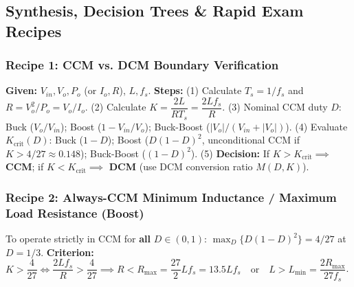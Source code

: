 \subsection{Synthesis, Decision Trees \& Rapid Exam Recipes}
\vspace{-4pt}

\subsubsection*{Recipe 1: CCM vs. DCM Boundary Verification}
\vspace{-4pt}
\textbf{Given:} $V_{in}, V_o, P_o$ (or $I_o, R$), $L, f_s$.
\textbf{Steps:}
(1) Calculate $T_s = 1/f_s$ and $R = V_o^2/P_o = V_o/I_o$.
(2) Calculate $K = \dfrac{2L}{R T_s} = \dfrac{2L f_s}{R}$.
(3) Nominal CCM duty $D$: Buck ($V_o/V_{in}$); Boost ($1-V_{in}/V_o$); Buck-Boost ($|V_o|/(V_{in}+|V_o|)$).
(4) Evaluate $K_{\mathrm{crit}}(D)$: Buck ($1-D$); Boost ($D(1-D)^2$, unconditional CCM if $K > 4/27 \approx 0.148$); Buck-Boost ($(1-D)^2$).
(5) \textbf{Decision:} If $K > K_{\mathrm{crit}} \implies$ \textbf{CCM}; if $K < K_{\mathrm{crit}} \implies$ \textbf{DCM} (use DCM conversion ratio $M(D,K)$).

\vspace{-4pt}
\subsubsection*{Recipe 2: Always-CCM Minimum Inductance / Maximum Load Resistance (Boost)}
\vspace{-4pt}
To operate strictly in CCM for \textbf{all} $D \in (0,1)$: $\max_D \{D(1-D)^2\} = 4/27$ at $D = 1/3$.
\textbf{Criterion:} $K > \dfrac{4}{27} \iff \dfrac{2L f_s}{R} > \dfrac{4}{27} \implies R < R_{\max} = \dfrac{27}{2} L f_s = 13.5 L f_s \quad \text{or} \quad L > L_{\min} = \dfrac{2 R_{\max}}{27 f_s}$.

\vspace{-4pt}
